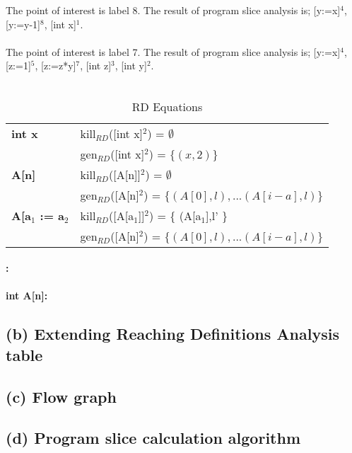 \documentclass[12pt]{article}
\begin{document}
The point of interest is label 8.  The result of program slice analysis is; [y:=x]$^4$, [y:=y-1]$^8$, [int x]$^1$.\\\\

The point of interest is label 7.  The result of program slice analysis is; [y:=x]$^4$, [z:=1]$^5$, [z:=z*y]$^7$, [int z]$^3$, [int y]$^2$.\\\\



\begin{table}[h]
    \begin{tabular}{l | l }
    \textbf{int x} &  kill$_{RD}$([int x]$^2$) = $\emptyset$ \\
                   &  gen$_{RD}$([int x]$^2$) = $\{(x,2)\}$ \\
    \hline
    \textbf{A[n]} & kill$_{RD}$([A[n]]$^2$) = $\emptyset$\\
                  & gen$_{RD}$([A[n]$^2$) = $\{(A[0],l), ... (A[i-a],l)\}$ \\

    \hline
    \textbf{A[a$_1$ := a$_2$} & kill$_{RD}$([A[a$_1$]]$^2$) = \{ (A[a$_1$],l' \} \\
                              & gen$_{RD}$([A[n]$^2$) = $\{(A[0],l), ... (A[i-a],l)\}$ \\

    \end{tabular}
    \centering
	\caption{RD Equations}
	\label{table:rd_equations}
\end{table}


\paragraph*{:}

\paragraph*{int A[n]:}


\subsection*{(b) Extending Reaching Definitions Analysis table}
\subsection*{(c) Flow graph}
\subsection*{(d) Program slice calculation algorithm}
\end{document}
